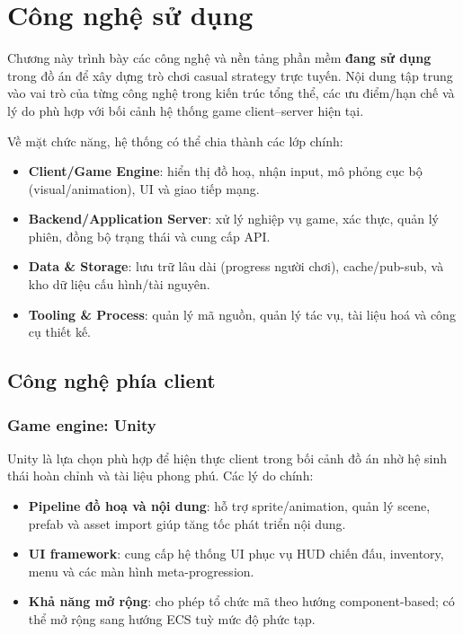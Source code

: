 ﻿\section{Công nghệ sử dụng}

Chương này trình bày các công nghệ và nền tảng phần mềm \textbf{đang sử dụng} trong đồ án để xây dựng trò chơi casual strategy trực tuyến. Nội dung tập trung vào vai trò của từng công nghệ trong kiến trúc tổng thể, các ưu điểm/\allowbreak hạn chế và lý do phù hợp với bối cảnh hệ thống game client--server hiện tại\cite{gregory-engine,moriarty-networked}.

Về mặt chức năng, hệ thống có thể chia thành các lớp chính:
\begin{itemize}
    \item \textbf{Client/\allowbreak Game Engine}: hiển thị đồ hoạ, nhận input, mô phỏng cục bộ (visual/\allowbreak animation), UI và giao tiếp mạng.
    \item \textbf{Backend/\allowbreak Application Server}: xử lý nghiệp vụ game, xác thực, quản lý phiên, đồng bộ trạng thái và cung cấp API.
    \item \textbf{Data \& Storage}: lưu trữ lâu dài (progress người chơi), cache/\allowbreak pub-sub, và kho dữ liệu cấu hình/\allowbreak tài nguyên.
    \item \textbf{Tooling \& Process}: quản lý mã nguồn, quản lý tác vụ, tài liệu hoá và công cụ thiết kế.
\end{itemize}

\subsection{Công nghệ phía client}

\subsubsection{Game engine: Unity}

Unity là lựa chọn phù hợp để hiện thực client trong bối cảnh đồ án nhờ hệ sinh thái hoàn chỉnh và tài liệu phong phú\cite{unity-manual}. Các lý do chính:
\begin{itemize}
    \item \textbf{Pipeline đồ hoạ và nội dung}: hỗ trợ sprite/\allowbreak animation, quản lý scene, prefab và asset import giúp tăng tốc phát triển nội dung.
    \item \textbf{UI framework}: cung cấp hệ thống UI phục vụ HUD chiến đấu, inventory, menu và các màn hình meta-progression.
    \item \textbf{Khả năng mở rộng}: cho phép tổ chức mã theo hướng component-based; có thể mở rộng sang hướng ECS tuỳ mức độ phức tạp\cite{gregory-engine}.
\end{itemize}

